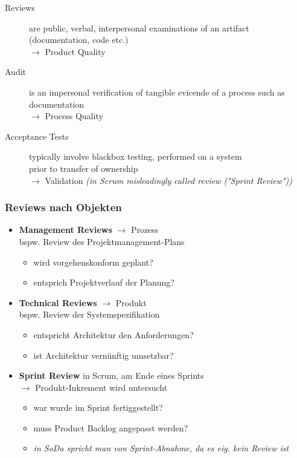 \documentclass[a4paper]{article}
\begin{document}
			\begin{description}
				\item[Reviews] are public, verbal, interpersonal examinations of an artifact (documentation, code etc.)\\
					$\rightarrow$ Product Quality
				\item[Audit] is an impersonal verification of tangible evicende of a process such as documentation\\
					$\rightarrow$ Process Quality
				\item[Acceptance Tests] typically involve blackbox testing, performed on a system \\
					prior to transfer of ownership\\
					$\rightarrow$ Validation \textit{(in Scrum misleadingly called review ("Sprint Review"))}
			\end{description}
		
			\subsubsection{Reviews nach Objekten}
			
			\begin{itemize}
				\item \textbf{Management Reviews} $\rightarrow$ Prozess\\
				bspw. Review des Projektmanagement-Plans
					\begin{itemize}
						\item wird vorgehenskonform geplant?
						\item entsprich Projektverlauf der Planung?
					\end{itemize}
				\item \textbf{Technical Reviews} $\rightarrow$ Produkt\\
				bspw. Review der Systemspezifikation
					\begin{itemize}
						\item entspricht Architektur den Anforderungen?
						\item ist Architektur vernünftig umsetzbar?
					\end{itemize}
				\item \textbf{Sprint Review} in Scrum, am Ende eines Sprints\\
					$\rightarrow$ Produkt-Inkrement wird untersucht
					\begin{itemize}
						\item war wurde im Sprint fertiggestellt?
						\item muss Product Backlog angepasst werden?
						\item \textit{in SoDa spricht man von Sprint-Abnahme, da es eig. kein Review ist}
					\end{itemize}
			\end{itemize}
		
\end{document}
